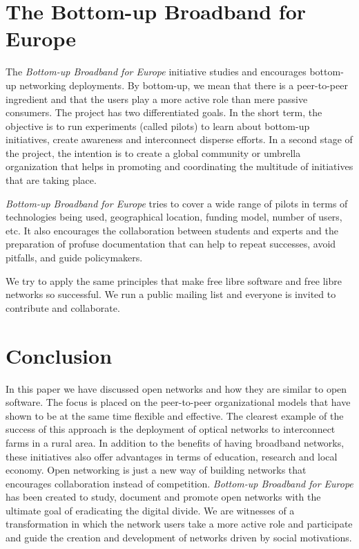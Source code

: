 \documentclass[journal]{IEEEtran}
\begin{document}


\section{The Bottom-up Broadband for Europe}

The \emph{Bottom-up Broadband for Europe} initiative studies and encourages bottom-up networking deployments.
By bottom-up, we mean that there is a peer-to-peer ingredient and that the users play a more active role than mere passive consumers.
The project has two differentiated goals.
In the short term, the objective is to run experiments (called pilots) to learn about bottom-up initiatives, create awareness and interconnect disperse efforts.
In a second stage of the project, the intention is to create a global community or umbrella organization that helps in promoting and coordinating the multitude of initiatives that are taking place.

\emph{Bottom-up Broadband for Europe} tries to cover a wide range of pilots in terms of technologies being used, geographical location, funding model, number of users, etc.
It also encourages the collaboration between students and experts and the preparation of profuse documentation that can help to repeat successes, avoid pitfalls, and guide policymakers.

We try to apply the same principles that make free libre software and free libre networks so successful.
We run a public mailing list and everyone is invited to contribute and collaborate.

\section{Conclusion} \label{sec:conclusion}

In this paper we have discussed open networks and how they are similar to open software.
The focus is placed on the peer-to-peer organizational models that have shown to be at the same time flexible and effective.
The clearest example of the success of this approach is the deployment of optical networks to interconnect farms in a rural area.
In addition to the benefits of having broadband networks, these initiatives also offer advantages in terms of education, research and local economy.
Open networking is just a new way of building networks that encourages collaboration instead of competition.
\emph{Bottom-up Broadband for Europe} has been created to study, document and promote open networks with the ultimate goal of eradicating the digital divide.
We are witnesses of a transformation in which the network users take a more active role and participate and guide the creation and development of networks driven by social motivations.
\end{document}
